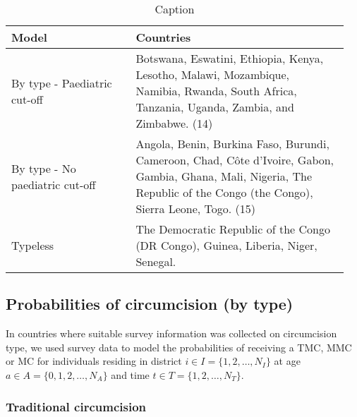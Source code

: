 \documentclass{article}
\begin{document}
\begin{appendix}
\begin{table}[H]
    \centering
    \begin{tabular}{p{0.35\linewidth} p{0.6\linewidth}}
        \hline
         \textbf{Model} & \textbf{Countries }  \\
        \hline
         By type - Paediatric cut-off & Botswana, Eswatini, Ethiopia, Kenya, Lesotho, Malawi, Mozambique, Namibia, Rwanda, South Africa, Tanzania, Uganda, Zambia, and Zimbabwe. (14) \\
         By type - No paediatric cut-off & Angola, Benin, Burkina Faso, Burundi, Cameroon, Chad, Côte d’Ivoire, Gabon, Gambia, Ghana, Mali, Nigeria, The Republic of the Congo (the Congo), Sierra Leone, Togo. (15) \\
         Typeless & The Democratic Republic of the Congo (DR Congo), Guinea, Liberia, Niger, Senegal. \\
        \hline
    \end{tabular}
    \caption{Caption}
    \label{tab:my_label}
\end{table}






\subsection{Probabilities of circumcision (by type)}
\label{sec::bytype}


In countries where suitable survey information was collected on circumcision type, we used survey data to model the probabilities of receiving a TMC, MMC or MC for individuals residing in district $i \in I = \{1, 2, \ldots, N_I\}$ at age $a \in A = \{0, 1, 2, \ldots, N_A\}$ and time $t \in T = \{1, 2, \ldots, N_T\}$. 


\subsubsection*{Traditional circumcision}


\end{appendix}
\end{document}
